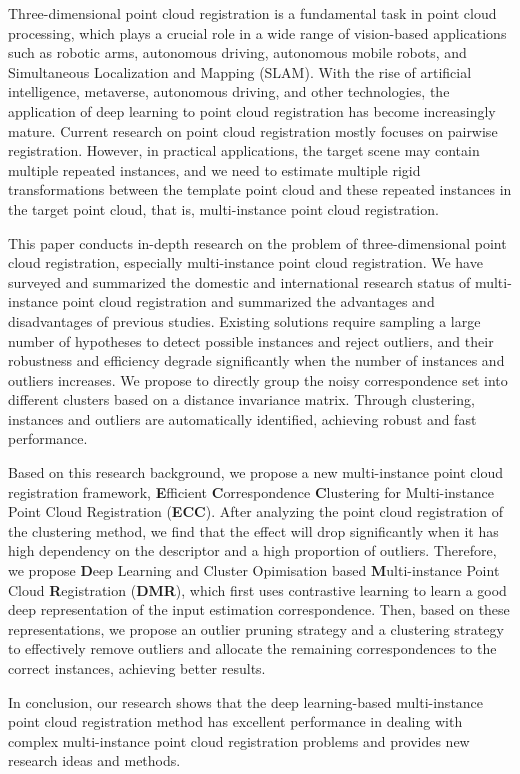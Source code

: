 \begin{abstractEn}
    Three-dimensional point cloud registration is a fundamental task in point cloud processing, which plays a crucial role in a wide range of vision-based applications such as robotic arms, autonomous driving, autonomous mobile robots, and Simultaneous Localization and Mapping (SLAM). With the rise of artificial intelligence, metaverse, autonomous driving, and other technologies, the application of deep learning to point cloud registration has become increasingly mature. Current research on point cloud registration mostly focuses on pairwise registration. However, in practical applications, the target scene may contain multiple repeated instances, and we need to estimate multiple rigid transformations between the template point cloud and these repeated instances in the target point cloud, that is, multi-instance point cloud registration.

    This paper conducts in-depth research on the problem of three-dimensional point cloud registration, especially multi-instance point cloud registration. We have surveyed and summarized the domestic and international research status of multi-instance point cloud registration and summarized the advantages and disadvantages of previous studies. Existing solutions require sampling a large number of hypotheses to detect possible instances and reject outliers, and their robustness and efficiency degrade significantly when the number of instances and outliers increases. We propose to directly group the noisy correspondence set into different clusters based on a distance invariance matrix. Through clustering, instances and outliers are automatically identified, achieving robust and fast performance.
    
    Based on this research background, we propose a new multi-instance point cloud registration framework, \textbf{E}fficient \textbf{C}orrespondence \textbf{C}lustering for Multi-instance Point Cloud Registration (\textbf{ECC}). After analyzing the point cloud registration of the clustering method, we find that the effect will drop significantly when it has high dependency on the descriptor and a high proportion of outliers. Therefore, we propose \textbf{D}eep Learning and Cluster Opimisation based \textbf{M}ulti-instance Point Cloud \textbf{R}egistration (\textbf{DMR}), which first uses contrastive learning to learn a good deep representation of the input estimation correspondence. Then, based on these representations, we propose an outlier pruning strategy and a clustering strategy to effectively remove outliers and allocate the remaining correspondences to the correct instances, achieving better results.
    
    In conclusion, our research shows that the deep learning-based multi-instance point cloud registration method has excellent performance in dealing with complex multi-instance point cloud registration problems and provides new research ideas and methods.
\end{abstractEn}
